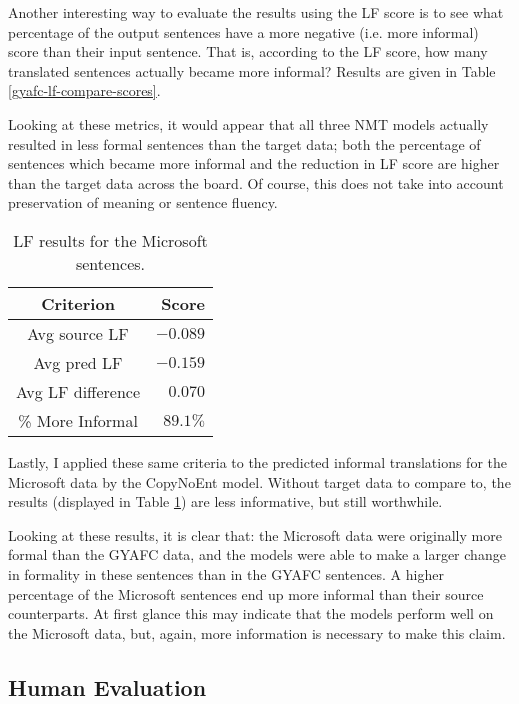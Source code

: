 Another interesting way to evaluate the results using the LF score is to see what percentage of the output sentences have a more negative (i.e. more informal) score than their input sentence. That is, according to the LF score, how many translated sentences actually became more informal? Results are given in Table \ref{gyafc-lf-compare-scores}.

Looking at these metrics, it would appear that all three NMT models actually resulted in less formal sentences than the target data; both the percentage of sentences which became more informal and the reduction in LF score are higher than the target data across the board. Of course, this does not take into account preservation of meaning or sentence fluency.

\begin{table}[h]
\centering
 \begin{tabular}{|| c | r ||} 
 \hline
 Criterion & Score \\ [0.3ex] 
 \hline\hline
 Avg source LF & $-0.089$ \\
 \hline
 Avg pred LF & $-0.159$ \\
 \hline
 Avg LF difference & $0.070$ \\
 \hline
 \% More Informal & $89.1\%$ \\
 \hline
\end{tabular}
\caption{LF results for the Microsoft sentences.}
\label{microsoft-lf}
\end{table}

Lastly, I applied these same criteria to the predicted informal translations for the Microsoft data by the CopyNoEnt model. Without target data to compare to, the results (displayed in Table \ref{microsoft-lf}) are less informative, but still worthwhile. 

Looking at these results, it is clear that: the Microsoft data were originally more formal than the GYAFC data, and the models were able to make a larger change in formality in these sentences than in the GYAFC sentences. A higher percentage of the Microsoft sentences end up more informal than their source counterparts. At first glance this may indicate that the models perform well on the Microsoft data, but, again, more information is necessary to make this claim.

\subsection{Human Evaluation}

